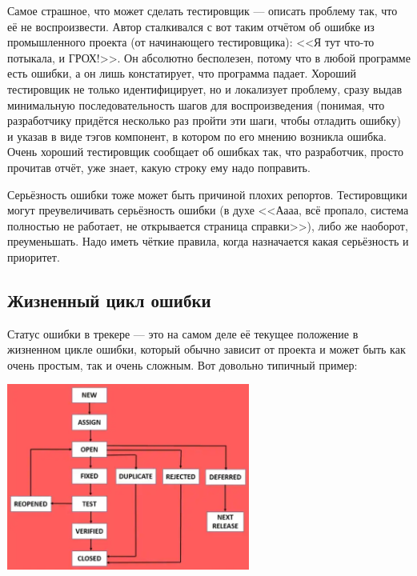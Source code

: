 \documentclass{../../text-style}
\begin{document}
Самое страшное, что может сделать тестировщик --- описать проблему так, что её не воспроизвести. Автор сталкивался с вот таким отчётом об ошибке из промышленного проекта (от начинающего тестировщика): <<Я тут что-то потыкала, и ГРОХ!>>. Он абсолютно бесполезен, потому что в любой программе есть ошибки, а он лишь констатирует, что программа падает. Хороший тестировщик не только идентифицирует, но и локализует проблему, сразу выдав минимальную последовательность шагов для воспроизведения (понимая, что разработчику придётся несколько раз пройти эти шаги, чтобы отладить ошибку) и указав в виде тэгов компонент, в котором по его мнению возникла ошибка. Очень хороший тестировщик сообщает об ошибках так, что разработчик, просто прочитав отчёт, уже знает, какую строку ему надо поправить.

Серьёзность ошибки тоже может быть причиной плохих репортов. Тестировщики могут преувеличивать серьёзность ошибки (в духе <<Аааа, всё пропало, система полностью не работает, не открывается страница справки>>), либо же наоборот, преуменьшать. Надо иметь чёткие правила, когда назначается какая серьёзность и приоритет.

\subsection{Жизненный цикл ошибки}

Статус ошибки в трекере --- это на самом деле её текущее положение в жизненном цикле ошибки, который обычно зависит от проекта и может быть как очень простым, так и очень сложным. Вот довольно типичный пример:

\begin{center}
    \includegraphics[width=0.6\textwidth]{bugLifecycle1.png}
\end{center}
\end{document}

